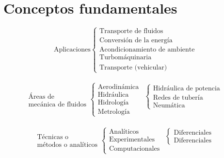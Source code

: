 \section{Conceptos fundamentales}

\[
    \text{Aplicaciones}
    \left\{
        \begin{array}{l}
            \text{Transporte de fluidos} \\
            \text{Conversión de la energía} \\
            \text{Acondicionamiento de ambiente} \\
            \text{Turbomáquinaria} \\
            \text{Transporte (vehicular)} 
        \end{array}
    \right.
\]

\[
    \begin{array}{c}
         \text{Áreas de}  \\
         \text{mecánica de fluidos}
    \end{array}
    \left\{ 
        \begin{array}{l}
             \text{Aerodinámica} \\
             \text{Hidráulica} \\ 
             \text{Hidrología} \\
             \text{Metrología}
        \end{array}
    \right.    
    \begin{array}{l}
        \\
        \left\{
            \begin{array}{l}
                \text{Hidráulica de potencia} \\
                \text{Redes de tubería} \\
                \text{Neumática}
            \end{array}
        \right. \\
        \\
        \\
    \end{array}
\]

\[
    \begin{array}{c}
         \text{Técnicas o}  \\
         \text{métodos o analíticos}
    \end{array}
    \left\{ 
        \begin{array}{l}
             \text{Analíticos} \\
             \text{Experimentales} \\ 
             \text{Computacionales} 
        \end{array}
    \right.    
    \begin{array}{l}
        \left\{
            \begin{array}{l}
                \text{Diferenciales} \\
                \text{Diferenciales} 
            \end{array}
        \right.\\
        \\
        \\
    \end{array}
\]

